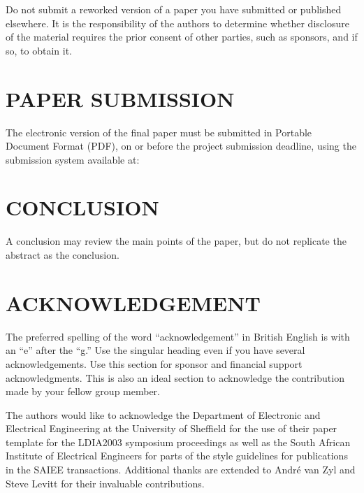 \documentclass[10pt,twocolumn]{witseiepaper}
\begin{document}
Do not submit a reworked version of a paper you have submitted or published
elsewhere. It is the responsibility of the authors to determine whether
disclosure of the material requires the prior consent of other parties, such as
sponsors, and if so, to obtain it.


%
\section{PAPER SUBMISSION}

The electronic version of the final paper must be submitted in Portable
Document Format (PDF), on or before the project submission deadline, using the
submission system available at:

\begin{center}
\end{center}


%
\section{CONCLUSION}

A conclusion may review the main points of the paper, but do not replicate the
abstract as the conclusion.


%
\section*{ACKNOWLEDGEMENT}

The preferred spelling of the word ``acknowledgement'' in British English is
with an ``e'' after the ``g.'' Use the singular heading even if you have
several acknowledgements. Use this section for sponsor and financial support
acknowledgments. This is also an ideal section to acknowledge the
contribution made by your fellow group member.

The authors would like to acknowledge the Department of Electronic and
Electrical Engineering at the University of Sheffield for the use of their
paper template for the LDIA2003 symposium proceedings as well as the South
African Institute of Electrical Engineers for parts of the style guidelines
for publications in the SAIEE transactions.  Additional thanks are extended to
Andr\'e van Zyl and Steve Levitt for their invaluable contributions.



%



\end{document}

